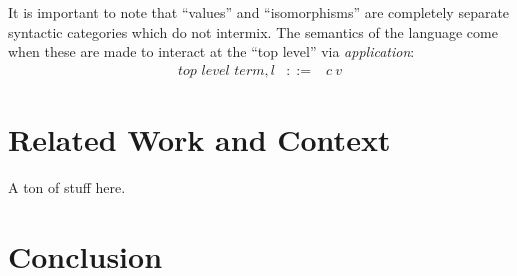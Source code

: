 \documentclass[authoryear,preprint]{sigplanconf}
\begin{document}
It is important to note that ``values'' and ``isomorphisms'' are completely
separate syntactic categories which do not intermix. The semantics of the
language come when these are made to interact at the ``top level'' via
\emph{application}: 
\[\begin{array}{lrcl}
\textit{top level term}, l &::=& c~v
\end{array}\]

\section{Related Work and Context}

A ton of stuff here. 

\section{Conclusion}


\softraggedright

\end{document}

